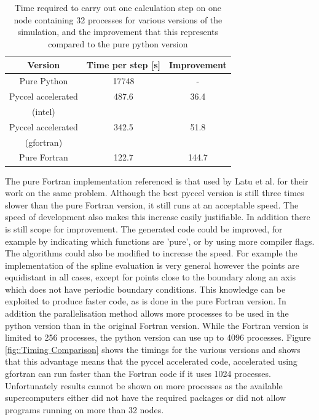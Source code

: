 \begin{table}[h]
\centering
 \begin{tabular}{|c|c|c|}
  \hline
  Version & Time per step [s] & Improvement\\
  \hline
  Pure Python & 17748\footnotemark & - \\
  \hline
  Pyccel accelerated & 487.6 & 36.4 \\
  (intel) & & \\
  \hline
  Pyccel accelerated & 342.5 & 51.8\\
  (gfortran) & & \\
  \hline
  Pure Fortran & 122.7 & 144.7\\
  \hline
 \end{tabular}
\caption{\label{tab::timings} Time required to carry out one calculation step on one node containing 32 processes for various versions of the simulation, and the improvement that this represents compared to the pure python version}
\end{table}

The pure Fortran implementation referenced is that used by Latu et al.\cite{YamanPaper} for their work on the same problem. Although the best pyccel version is still three times slower than the pure Fortran version, it still runs at an acceptable speed. The speed of development also makes this increase easily justifiable. In addition there is still scope for improvement. The generated code could be improved, for example by indicating which functions are 'pure', or by using more compiler flags. The algorithms could also be modified to increase the speed. For example the implementation of the spline evaluation is very general however the points are equidistant in all cases, except for points close to the boundary along an axis which does not have periodic boundary conditions. This knowledge can be exploited to produce faster code, as is done in the pure Fortran version. In addition the parallelisation method allows more processes to be used in the python version than in the original Fortran version. While the Fortran version is limited to 256 processes, the python version can use up to 4096 processes. Figure \ref{fig::Timing Comparison} shows the timings for the various versions and shows that this advantage means that the pyccel accelerated code, accelerated using gfortran can run faster than the Fortran code if it uses 1024 processes. Unfortunately results cannot be shown on more processes as the available supercomputers either did not have the required packages or did not allow programs running on more than 32 nodes.

